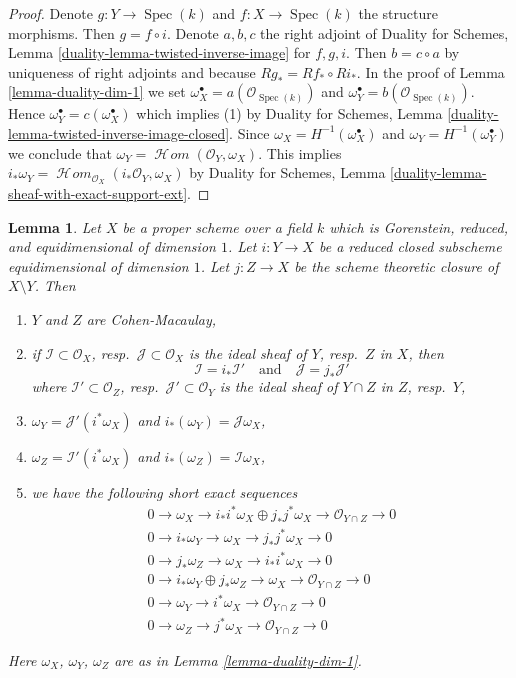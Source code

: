 \documentclass{stacks-project}
\theoremstyle{plain}
\newtheorem{lemma}[subsection]{Lemma}
\theoremstyle{definition}
\theoremstyle{remark}
\numberwithin{equation}{subsection}
\def\Spec{\mathop{\mathrm{Spec}}}
\def\SheafHom{\mathop{\mathcal{H}\!\mathit{om}}\nolimits}
\begin{document}
\begin{proof}
Denote $g : Y \to \Spec(k)$ and $f : X \to \Spec(k)$ the structure morphisms.
Then $g = f \circ i$. Denote $a, b, c$ the right adjoint of
Duality for Schemes, Lemma
\ref{duality-lemma-twisted-inverse-image} for $f, g, i$.
Then $b = c \circ a$ by uniqueness of right adjoints
and because $Rg_* = Rf_* \circ Ri_*$.
In the proof of Lemma \ref{lemma-duality-dim-1}
we set
$\omega_X^\bullet = a(\mathcal{O}_{\Spec(k)})$ and
$\omega_Y^\bullet = b(\mathcal{O}_{\Spec(k)})$.
Hence $\omega_Y^\bullet = c(\omega_X^\bullet)$
which implies (1) by Duality for Schemes, Lemma
\ref{duality-lemma-twisted-inverse-image-closed}.
Since $\omega_X = H^{-1}(\omega_X^\bullet)$ and
$\omega_Y = H^{-1}(\omega_Y^\bullet)$ we conclude that
$\omega_Y = \SheafHom(\mathcal{O}_Y, \omega_X)$.
This implies
$i_*\omega_Y = \SheafHom_{\mathcal{O}_X}(i_*\mathcal{O}_Y, \omega_X)$
by Duality for Schemes, Lemma
\ref{duality-lemma-sheaf-with-exact-support-ext}.
\end{proof}

\begin{lemma}
\label{lemma-closed-subscheme-reduced-gorenstein}
Let $X$ be a proper scheme over a field $k$ which is
Gorenstein, reduced, and equidimensional of dimension $1$.
Let $i : Y \to X$ be a reduced closed subscheme equidimensional
of dimension $1$. Let $j : Z \to X$ be the scheme theoretic
closure of $X \setminus Y$. Then
\begin{enumerate}
\item $Y$ and $Z$ are Cohen-Macaulay,
\item if $\mathcal{I} \subset \mathcal{O}_X$,
resp.\ $\mathcal{J} \subset \mathcal{O}_X$ is the ideal sheaf of
$Y$, resp.\ $Z$ in $X$, then
$$
\mathcal{I} = i_*\mathcal{I}'
\quad\text{and}\quad
\mathcal{J} = j_*\mathcal{J}'
$$
where $\mathcal{I}' \subset \mathcal{O}_Z$,
resp.\ $\mathcal{J}' \subset \mathcal{O}_Y$ is the ideal sheaf
of $Y \cap Z$ in $Z$, resp.\ $Y$,
\item $\omega_Y = \mathcal{J}'(i^*\omega_X)$ and
$i_*(\omega_Y) = \mathcal{J}\omega_X$,
\item $\omega_Z = \mathcal{I}'(i^*\omega_X)$ and
$i_*(\omega_Z) = \mathcal{I}\omega_X$,
\item we have the following short exact sequences
\begin{align*}
0 \to \omega_X \to i_*i^*\omega_X \oplus j_*j^*\omega_X \to
\mathcal{O}_{Y \cap Z} \to 0 \\
0 \to i_*\omega_Y \to \omega_X \to j_*j^*\omega_X \to 0 \\
0 \to j_*\omega_Z \to \omega_X \to i_*i^*\omega_X \to 0 \\
0 \to i_*\omega_Y \oplus j_*\omega_Z \to \omega_X \to
\mathcal{O}_{Y \cap Z} \to 0 \\
0 \to \omega_Y \to i^*\omega_X \to \mathcal{O}_{Y \cap Z} \to 0 \\
0 \to \omega_Z \to j^*\omega_X \to \mathcal{O}_{Y \cap Z} \to 0
\end{align*}
\end{enumerate}
Here $\omega_X$, $\omega_Y$, $\omega_Z$ are as in
Lemma \ref{lemma-duality-dim-1}.
\end{lemma}
\end{document}
